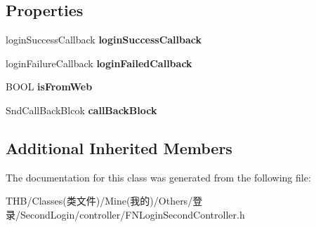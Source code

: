 \subsection*{Properties}
\begin{DoxyCompactItemize}
\item 
\mbox{\label{interface_f_n_login_second_controller_a67bcb8238532c8dd062b3b51826c45eb}} 
login\+Success\+Callback {\bfseries login\+Success\+Callback}
\item 
\mbox{\label{interface_f_n_login_second_controller_a524d975c6817fa2c3546ffb2f42d8c36}} 
login\+Failure\+Callback {\bfseries login\+Failed\+Callback}
\item 
\mbox{\label{interface_f_n_login_second_controller_a982d39000139112bea99775d51ab7d47}} 
B\+O\+OL {\bfseries is\+From\+Web}
\item 
\mbox{\label{interface_f_n_login_second_controller_abfa4b25f36b07fd32f4a37f1960cf364}} 
Snd\+Call\+Back\+Blcok {\bfseries call\+Back\+Block}
\end{DoxyCompactItemize}
\subsection*{Additional Inherited Members}


The documentation for this class was generated from the following file\+:\begin{DoxyCompactItemize}
\item 
T\+H\+B/\+Classes(类文件)/\+Mine(我的)/\+Others/登录/\+Second\+Login/controller/F\+N\+Login\+Second\+Controller.\+h\end{DoxyCompactItemize}

